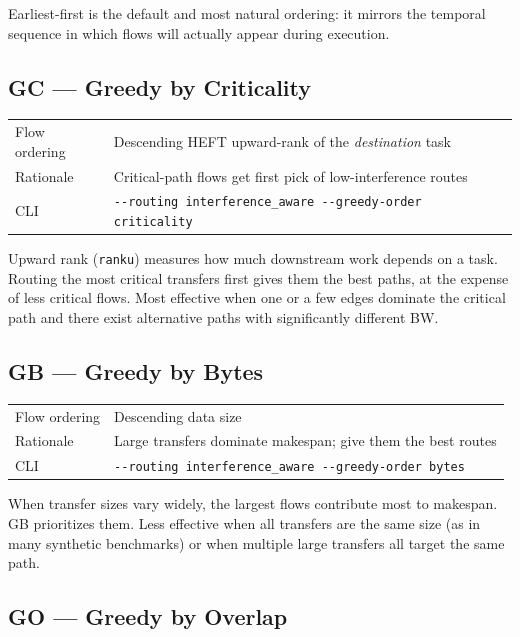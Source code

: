 \documentclass[11pt]{article}
\begin{document}
\medskip
Earliest-first is the default and most natural ordering: it mirrors the
temporal sequence in which flows will actually appear during execution.

\subsection{GC --- Greedy by Criticality}

\begin{tabular}{@{}lp{9cm}@{}}
\toprule
Flow ordering & Descending HEFT upward-rank of the \emph{destination} task \\
Rationale     & Critical-path flows get first pick of low-interference routes \\
CLI           & \texttt{-{}-routing interference\_aware -{}-greedy-order criticality} \\
\bottomrule
\end{tabular}

\medskip
Upward rank (\texttt{ranku}) measures how much downstream work depends on a
task.  Routing the most critical transfers first gives them the best paths,
at the expense of less critical flows.  Most effective when one or a few
edges dominate the critical path and there exist alternative paths with
significantly different BW.

\subsection{GB --- Greedy by Bytes}

\begin{tabular}{@{}lp{9cm}@{}}
\toprule
Flow ordering & Descending data size \\
Rationale     & Large transfers dominate makespan; give them the best routes \\
CLI           & \texttt{-{}-routing interference\_aware -{}-greedy-order bytes} \\
\bottomrule
\end{tabular}

\medskip
When transfer sizes vary widely, the largest flows contribute most to makespan.
GB prioritizes them.  Less effective when all transfers are the same size
(as in many synthetic benchmarks) or when multiple large transfers all target
the same path.

\subsection{GO --- Greedy by Overlap}
\end{document}
